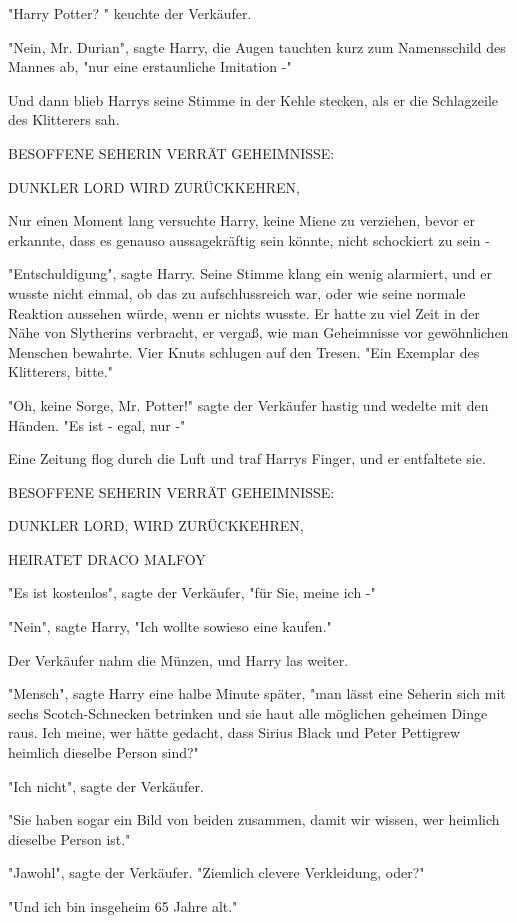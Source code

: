 {"Harry Potter? " keuchte der Verkäufer.

"Nein, Mr. Durian", sagte Harry, die Augen tauchten kurz zum Namensschild des Mannes ab, "nur eine erstaunliche Imitation -"

Und dann blieb Harrys seine Stimme in der Kehle stecken, als er die Schlagzeile des Klitterers sah.

BESOFFENE SEHERIN VERRÄT GEHEIMNISSE:

DUNKLER LORD WIRD ZURÜCKKEHREN,

Nur einen Moment lang versuchte Harry, keine Miene zu verziehen, bevor er erkannte, dass es genauso aussagekräftig sein könnte, nicht schockiert zu sein -

"Entschuldigung", sagte Harry. Seine Stimme klang ein wenig alarmiert, und er wusste nicht einmal, ob das zu aufschlussreich war, oder wie seine normale Reaktion aussehen würde, wenn er nichts wusste. Er hatte zu viel Zeit in der Nähe von Slytherins verbracht, er vergaß, wie man Geheimnisse vor gewöhnlichen Menschen bewahrte. Vier Knuts schlugen auf den Tresen. "Ein Exemplar des Klitterers, bitte."

"Oh, keine Sorge, Mr. Potter!" sagte der Verkäufer hastig und wedelte mit den Händen. "Es ist - egal, nur -"

Eine Zeitung flog durch die Luft und traf Harrys Finger, und er entfaltete sie.

BESOFFENE SEHERIN VERRÄT GEHEIMNISSE:

DUNKLER LORD, WIRD ZURÜCKKEHREN,

HEIRATET DRACO MALFOY

"Es ist kostenlos", sagte der Verkäufer, "für Sie, meine ich -"

"Nein", sagte Harry, "Ich wollte sowieso eine kaufen."

Der Verkäufer nahm die Münzen, und Harry las weiter.

"Mensch", sagte Harry eine halbe Minute später, "man lässt eine Seherin sich mit sechs Scotch-Schnecken betrinken und sie haut alle möglichen geheimen Dinge raus. Ich meine, wer hätte gedacht, dass Sirius Black und Peter Pettigrew heimlich dieselbe Person sind?"

"Ich nicht", sagte der Verkäufer.

"Sie haben sogar ein Bild von beiden zusammen, damit wir wissen, wer heimlich dieselbe Person ist."

"Jawohl", sagte der Verkäufer. "Ziemlich clevere Verkleidung, oder?"

"Und ich bin insgeheim 65 Jahre alt."

}
